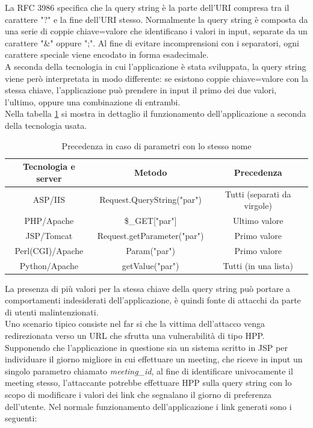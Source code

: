 La RFC 3986\cite{rfc3986} specifica che la query string è la parte dell'URI compresa tra il carattere "?" e la fine dell'URI stesso. Normalmente la query string è composta da una serie di coppie chiave=valore che identificano i valori in input, separate da un carattere "\&" oppure ";". Al fine di evitare incomprensioni con i separatori, ogni carattere speciale viene encodato in forma esadecimale.	\\
A seconda della tecnologia in cui l'applicazione è stata sviluppata, la query string viene però interpretata in modo differente: se esistono coppie chiave=valore con la stessa chiave, l'applicazione può prendere in input il primo dei due valori, l'ultimo, oppure una combinazione di entrambi.\\
Nella tabella \ref{hpp} si mostra in dettaglio il funzionamento dell'applicazione a seconda della tecnologia usata.

\begin{table}[!h]
\center
\begin{tabular}{|c|c|c|}
\hline
Tecnologia e server & Metodo & Precedenza \\
\hline
ASP/IIS & Request.QueryString("par") & Tutti (separati da virgole)\\
PHP/Apache & \$\_GET["par"] & Ultimo valore \\
JSP/Tomcat & Request.getParameter("par") & Primo valore \\
Perl(CGI)/Apache & Param("par") & Primo valore \\
Python/Apache & getValue("par") & Tutti (in una lista)\\
\hline
\end{tabular}
\caption{Precedenza in caso di parametri con lo stesso nome}
\label{hpp}
\end{table}


La presenza di più valori per la stessa chiave della query string può portare a comportamenti indesiderati dell'applicazione, è quindi fonte di attacchi da parte di utenti malintenzionati.\\
Uno scenario tipico consiste nel far si che la vittima dell'attacco venga redirezionata verso un URL che sfrutta una vulnerabilità di tipo HPP. Supponendo che l'applicazione in questione sia un sistema scritto in JSP per individuare il giorno migliore in cui effettuare un meeting, che riceve in input un singolo parametro chiamato \emph{meeting\_id}, al fine di identificare univocamente il meeting stesso, l'attaccante potrebbe effettuare HPP sulla query string con lo scopo di modificare i valori dei link che segnalano il giorno di preferenza dell'utente.
Nel normale funzionamento dell'applicazione i link generati sono i seguenti:\\

